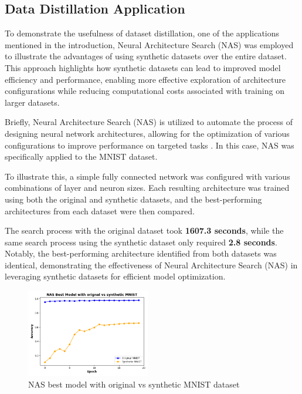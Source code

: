 \documentclass[conference, compsoc]{IEEEtran}
\begin{document}
	\subsection{Data Distillation Application}
	
	To demonstrate the usefulness of dataset distillation, one of the applications mentioned in the introduction, Neural Architecture Search (NAS) was employed to illustrate the advantages of using synthetic datasets over the entire dataset. This approach highlights how synthetic datasets can lead to improved model efficiency and performance, enabling more effective exploration of architecture configurations while reducing computational costs associated with training on larger datasets.
	
	Briefly, Neural Architecture Search (NAS) is utilized to automate the process of designing neural network architectures, allowing for the optimization of various configurations to improve performance on targeted tasks \cite{white2023neuralarchitecturesearchinsights}. In this case, NAS was specifically applied to the MNIST dataset.
	
	To illustrate this, a simple fully connected network was configured with various combinations of layer and neuron sizes. Each resulting architecture was trained using both the original and synthetic datasets, and the best-performing architectures from each dataset were then compared.
	
	The search process with the original dataset took \textbf{1607.3 seconds}, while the same search process using the synthetic dataset only required \textbf{2.8 seconds}. Notably, the best-performing architecture identified from both datasets was identical, demonstrating the effectiveness of Neural Architecture Search (NAS) in leveraging synthetic datasets for efficient model optimization.
	
	\begin{figure}[H]
		\centering
		\includegraphics[width=0.48\textwidth]{nas_comparision.png}
		\caption{NAS best model with original vs synthetic MNIST dataset}
		\label{fig:nas_comparision}
	\end{figure}
\end{document}
